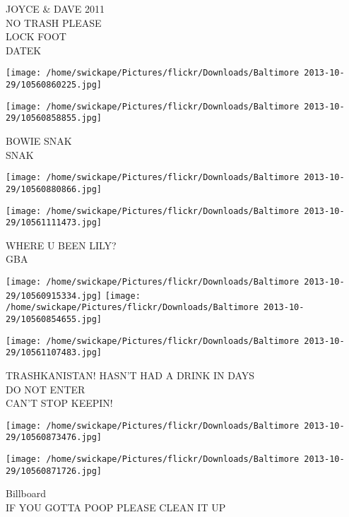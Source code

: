 \documentclass[10pt,letterpaper]{article}
\begin{document}
JOYCE \& DAVE 2011\\
NO TRASH PLEASE\\
LOCK FOOT\\
DATEK\\
\pagebreak

\texttt{[image: /home/swickape/Pictures/flickr/Downloads/Baltimore 2013-10-29/10560860225.jpg]}

\vspace{0.25in}
\texttt{[image: /home/swickape/Pictures/flickr/Downloads/Baltimore 2013-10-29/10560858855.jpg]}

BOWIE SNAK\\
SNAK\\
\pagebreak

\texttt{[image: /home/swickape/Pictures/flickr/Downloads/Baltimore 2013-10-29/10560880866.jpg]}

\vspace{0.25in}
\texttt{[image: /home/swickape/Pictures/flickr/Downloads/Baltimore 2013-10-29/10561111473.jpg]}

WHERE U BEEN LILY?\\
GBA\\
\pagebreak

\texttt{[image: /home/swickape/Pictures/flickr/Downloads/Baltimore 2013-10-29/10560915334.jpg]}
\texttt{[image: /home/swickape/Pictures/flickr/Downloads/Baltimore 2013-10-29/10560854655.jpg]}

\vspace{0.25in}
\texttt{[image: /home/swickape/Pictures/flickr/Downloads/Baltimore 2013-10-29/10561107483.jpg]}

TRASHKANISTAN! HASN'T HAD A DRINK IN DAYS\\
DO NOT ENTER\\
CAN'T STOP KEEPIN!\\
\pagebreak

\texttt{[image: /home/swickape/Pictures/flickr/Downloads/Baltimore 2013-10-29/10560873476.jpg]}

\vspace{0.25in}
\texttt{[image: /home/swickape/Pictures/flickr/Downloads/Baltimore 2013-10-29/10560871726.jpg]}

Billboard\\
IF YOU GOTTA POOP PLEASE CLEAN IT UP\\
\pagebreak
\end{document}
